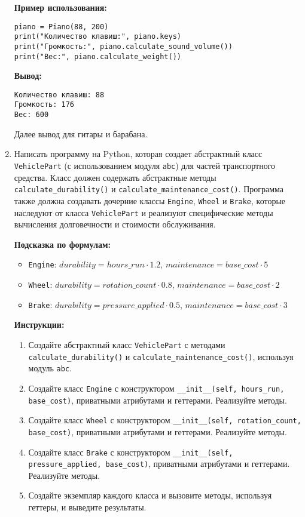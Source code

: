 \begin{enumerate}
\textbf{Пример использования:}
\begin{verbatim}
piano = Piano(88, 200)
print("Количество клавиш:", piano.keys)
print("Громкость:", piano.calculate_sound_volume())
print("Вес:", piano.calculate_weight())
\end{verbatim}

\textbf{Вывод:}
\begin{verbatim}
Количество клавиш: 88
Громкость: 176
Вес: 600
\end{verbatim}

Далее вывод для гитары и барабана.

\item
Написать программу на Python, которая создает абстрактный класс \texttt{VehiclePart} (с использованием модуля \texttt{abc}) для частей транспортного средства. 
Класс должен содержать абстрактные методы \texttt{calculate\_durability()} и \texttt{calculate\_maintenance\_cost()}. 
Программа также должна создавать дочерние классы \texttt{Engine}, \texttt{Wheel} и \texttt{Brake}, 
которые наследуют от класса \texttt{VehiclePart} и реализуют специфические методы вычисления долговечности и стоимости обслуживания.

\textbf{Подсказка по формулам:}
\begin{itemize}
    \item \texttt{Engine}: $durability = hours\_run \cdot 1.2$, $maintenance = base\_cost \cdot 5$
    \item \texttt{Wheel}: $durability = rotation\_count \cdot 0.8$, $maintenance = base\_cost \cdot 2$
    \item \texttt{Brake}: $durability = pressure\_applied \cdot 0.5$, $maintenance = base\_cost \cdot 3$
\end{itemize}

\textbf{Инструкции:}
\begin{enumerate}
    \item Создайте абстрактный класс \texttt{VehiclePart} с методами \texttt{calculate\_durability()} и \texttt{calculate\_maintenance\_cost()}, используя модуль \texttt{abc}.
    \item Создайте класс \texttt{Engine} с конструктором \texttt{\_\_init\_\_(self, hours\_run, base\_cost)}, приватными атрибутами и геттерами. Реализуйте методы.
    \item Создайте класс \texttt{Wheel} с конструктором \texttt{\_\_init\_\_(self, rotation\_count, base\_cost)}, приватными атрибутами и геттерами. Реализуйте методы.
    \item Создайте класс \texttt{Brake} с конструктором \texttt{\_\_init\_\_(self, pressure\_applied, base\_cost)}, приватными атрибутами и геттерами. Реализуйте методы.
    \item Создайте экземпляр каждого класса и вызовите методы, используя геттеры, и выведите результаты.
\end{enumerate}


\end{enumerate}
